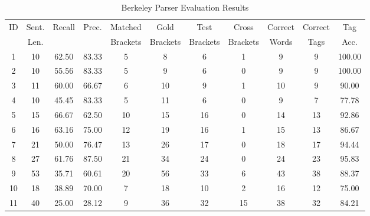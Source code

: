 \begin{table*}[htbp!]
\centering
\begin{tabular}{@{}ccccccccccc@{}}
\toprule
ID & Sent. & Recall & Prec. & Matched & Gold & Test & Cross & Correct & Correct & Tag \\
 & Len. & & & Brackets & Brackets & Brackets & Brackets & Words & Tags & Acc. \\
\midrule
1 & 10 & 62.50 & 83.33 & 5 & 8 & 6 & 1 & 9 & 9 & 100.00 \\
2 & 10 & 55.56 & 83.33 & 5 & 9 & 6 & 0 & 9 & 9 & 100.00 \\
3 & 11 & 60.00 & 66.67 & 6 & 10 & 9 & 1 & 10 & 9 & 90.00 \\
4 & 10 & 45.45 & 83.33 & 5 & 11 & 6 & 0 & 9 & 7 & 77.78 \\
5 & 15 & 66.67 & 62.50 & 10 & 15 & 16 & 0 & 14 & 13 & 92.86 \\
6 & 16 & 63.16 & 75.00 & 12 & 19 & 16 & 1 & 15 & 13 & 86.67 \\
7 & 21 & 50.00 & 76.47 & 13 & 26 & 17 & 0 & 18 & 17 & 94.44 \\
8 & 27 & 61.76 & 87.50 & 21 & 34 & 24 & 0 & 24 & 23 & 95.83 \\
9 & 53 & 35.71 & 60.61 & 20 & 56 & 33 & 6 & 43 & 38 & 88.37 \\
10 & 18 & 38.89 & 70.00 & 7 & 18 & 10 & 2 & 16 & 12 & 75.00 \\
11 & 40 & 25.00 & 28.12 & 9 & 36 & 32 & 15 & 38 & 32 & 84.21 \\
\bottomrule
\end{tabular}
\caption{Berkeley Parser Evaluation Results}
\label{tab:parser_eval}
\end{table*}
